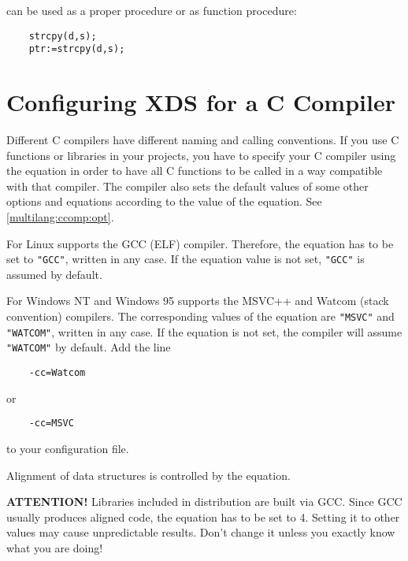 can be used as a proper procedure or as function procedure:

\verb'    strcpy(d,s);'\\
\verb'    ptr:=strcpy(d,s);'

\ifgencode


\section{Configuring XDS for a C Compiler}\label{multilang:ccomp}


Different C compilers have different naming and calling conventions.
If you use C functions or libraries in your projects,
you have to specify your C compiler using the  equation in
order to have all C functions to be called in a way compatible with
that compiler. The compiler also sets the default values of some
other options and equations according to the value of the  equation.
\iflinux \else See \ref{multilang:ccomp:opt}. \fi %

\iflinux
  For Linux \XDS{} supports the GCC (ELF) compiler. Therefore, the 
  equation has to be set to \verb'"GCC"', written in any case. If the equation value
  is not set, \verb'"GCC"' is assumed by default.
\fi

\ifwinnt
  For Windows NT and Windows 95 \XDS{} supports the MSVC++ and Watcom
  (stack convention) compilers. The corresponding values of the 
  equation are \verb'"MSVC"' and \verb'"WATCOM"', written in any case.
  If the equation is not set, the compiler will assume \verb'"WATCOM"'
  by default. Add the line

  \verb'    -cc=Watcom'

  or

  \verb'    -cc=MSVC'

  to your configuration file.
\fi

Alignment of data structures is controlled by the  equation.

\iflinux
  {\bf ATTENTION!} Libraries included in \XDS{} distribution are built via
  GCC. Since GCC usually produces aligned code, the  equation
  has to be set to 4. Setting it to other values may cause unpredictable results.
  Don't change it unless you exactly know what you are doing!
\fi


